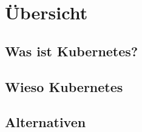 \section{Übersicht}
\subsection{Was ist Kubernetes?}
\subsection{Wieso Kubernetes}
\subsection{Alternativen}
\clearpage